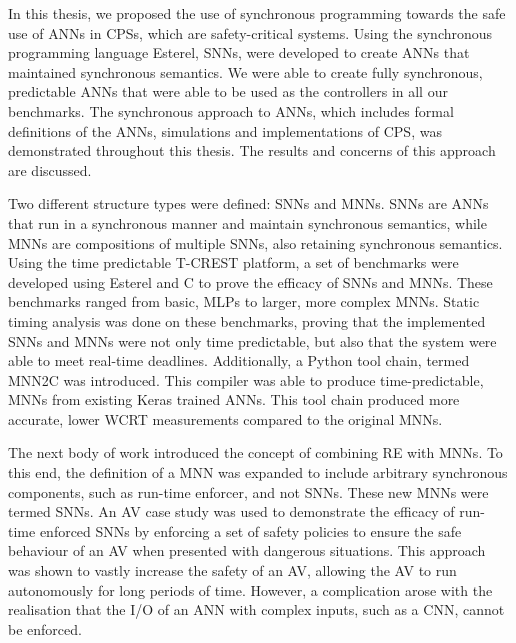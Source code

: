 In this thesis, we proposed the use of synchronous programming towards the safe use of \acfp{ANN} in \acfp{CPS}, which are safety-critical systems.
Using the synchronous programming language Esterel, \acfp{SNN}, were developed to create \acp{ANN} that maintained synchronous semantics.
We were able to create fully synchronous, predictable \acp{ANN} that were able to be used as the controllers in all our benchmarks.
The synchronous approach to \acp{ANN}, which includes formal definitions of the \acp{ANN}, simulations and implementations of \ac{CPS}, was demonstrated throughout this thesis.
The results and concerns of this approach are discussed.

Two different structure types were defined: \acp{SNN} and \acp{MNN}.
\acp{SNN} are \acp{ANN} that run in a synchronous manner and maintain synchronous semantics, while \acp{MNN} are compositions of multiple \acp{SNN}, also retaining synchronous semantics.
Using the time predictable T-CREST platform, a set of benchmarks were developed using Esterel and C to prove the efficacy of \acp{SNN} and \acp{MNN}. 
These benchmarks ranged from basic, \acfp{MLP} to larger, more complex \acfp{MNN}.
Static timing analysis was done on these benchmarks, proving that the implemented \acp{SNN} and \acp{MNN} were not only time predictable, but also that the system were able to meet real-time deadlines.
Additionally, a Python tool chain, termed \acf{MNN2C} was introduced.
This compiler was able to produce time-predictable, \acp{MNN} from existing Keras trained \acp{ANN}.
This tool chain produced more accurate, lower \acf{WCRT} measurements compared to the original \acp{MNN}.

The next body of work introduced the concept of combining \acf{RE} with \acp{MNN}.
To this end, the definition of a \ac{MNN} was expanded to include arbitrary synchronous components, such as run-time enforcer, and not \acp{SNN}.
These new \acp{MNN} were termed \acfp{SNN}.
An \ac{AV} case study was used to demonstrate the efficacy of run-time enforced \acp{SNN} by enforcing a set of safety policies to ensure the safe behaviour of an \ac{AV} when presented with dangerous situations.
This approach was shown to vastly increase the safety of an \ac{AV}, allowing the \ac{AV} to run autonomously for long periods of time.
However, a complication arose with the realisation that the I/O of an \ac{ANN} with complex inputs, such as a \acf{CNN}, cannot be enforced.


